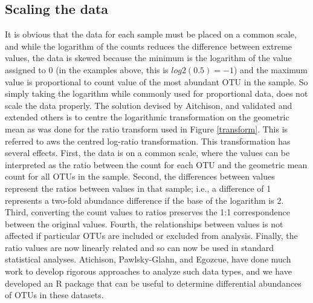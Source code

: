 \documentclass[11pt]{article}\usepackage[]{graphicx}\usepackage[]{color}
\begin{document}
\subsection{Scaling the data}
It is obvious that the data for each sample must be placed on a common scale, and while the logarithm of the counts reduces the difference between extreme values, the data is skewed because the minimum is the logarithm of the value assigned to 0 (in the examples above, this is $log2(0.5)=-1$) and the maximum value is proportional to count value of the most abundant OTU in the sample. So simply taking the logarithm while commonly used for proportional data, does not scale the data properly\cite{Aitchison:1986}. The solution devised by Aitchison, and validated and extended others\cite{pawlowsky2011compositional} is to centre the logarithmic transformation on the geometric mean as was done for the ratio transform used in Figure \ref{transform}. This is referred to aws the centred log-ratio transformation. This transformation has several effects. First, the data is on a common scale, where the values can be interpreted as the ratio between the count for each OTU and the geometric mean count for all OTUs in the sample. Second, the differences between values represent the ratios between values in that sample; i.e., a difference of 1 represents a two-fold abundance difference if the base of the logarithm is 2. Third, converting the count values to ratios preserves the 1:1 correspondence between the original values. Fourth, the relationships between values is not affected if particular OTUs are included or excluded from analysis. Finally, the ratio values are now linearly related and so can now be used in standard statistical analyses. Atichison\cite{Aitchison:1986}, Pawlsky-Glahn\cite{Pawlowsky-Glahn:2006}, and Egozcue\cite{egozcue2005}, have done much work to develop rigorous approaches to analyze such data types\cite{pawlowsky2011compositional}, and we have developed an R package that can be useful to determine differential abundances of OTUs in these datasets\cite{fernandes:2013,fernandes:2014}. 
\end{document}
